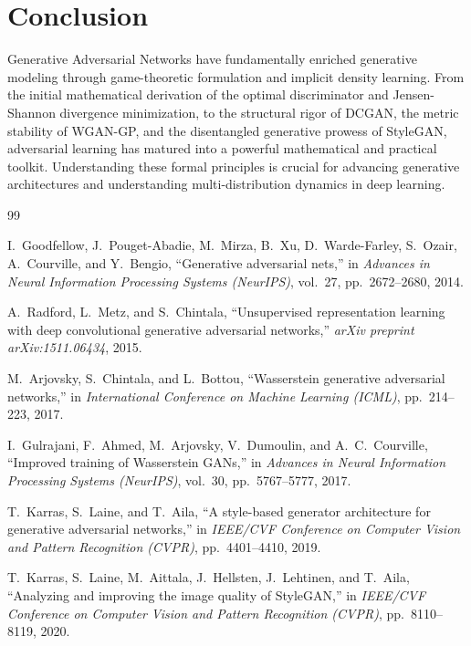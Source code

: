 \documentclass[conference]{IEEEtran}
\begin{document}
\section{Conclusion}
Generative Adversarial Networks have fundamentally enriched generative modeling through game-theoretic formulation and implicit density learning. From the initial mathematical derivation of the optimal discriminator and Jensen-Shannon divergence minimization, to the structural rigor of DCGAN, the metric stability of WGAN-GP, and the disentangled generative prowess of StyleGAN, adversarial learning has matured into a powerful mathematical and practical toolkit. Understanding these formal principles is crucial for advancing generative architectures and understanding multi-distribution dynamics in deep learning.

\begin{thebibliography}{99}

I.~Goodfellow, J.~Pouget-Abadie, M.~Mirza, B.~Xu, D.~Warde-Farley, S.~Ozair, A.~Courville, and Y.~Bengio, ``Generative adversarial nets,'' in \textit{Advances in Neural Information Processing Systems (NeurIPS)}, vol.~27, pp.~2672--2680, 2014.

A.~Radford, L.~Metz, and S.~Chintala, ``Unsupervised representation learning with deep convolutional generative adversarial networks,'' \textit{arXiv preprint arXiv:1511.06434}, 2015.

M.~Arjovsky, S.~Chintala, and L.~Bottou, ``Wasserstein generative adversarial networks,'' in \textit{International Conference on Machine Learning (ICML)}, pp.~214--223, 2017.

I.~Gulrajani, F.~Ahmed, M.~Arjovsky, V.~Dumoulin, and A.~C.~Courville, ``Improved training of Wasserstein GANs,'' in \textit{Advances in Neural Information Processing Systems (NeurIPS)}, vol.~30, pp.~5767--5777, 2017.

T.~Karras, S.~Laine, and T.~Aila, ``A style-based generator architecture for generative adversarial networks,'' in \textit{IEEE/CVF Conference on Computer Vision and Pattern Recognition (CVPR)}, pp.~4401--4410, 2019.

T.~Karras, S.~Laine, M.~Aittala, J.~Hellsten, J.~Lehtinen, and T.~Aila, ``Analyzing and improving the image quality of StyleGAN,'' in \textit{IEEE/CVF Conference on Computer Vision and Pattern Recognition (CVPR)}, pp.~8110--8119, 2020.


\end{thebibliography}
\end{document}

